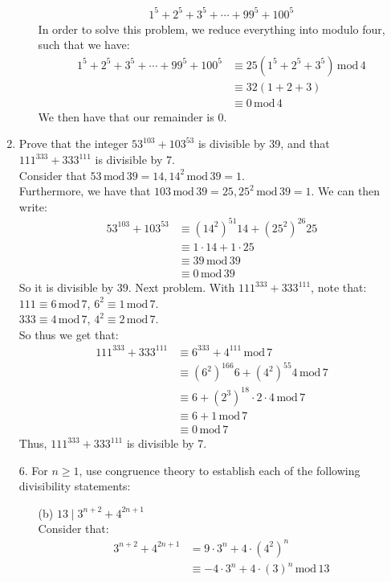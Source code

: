 \documentclass[10pt,oneside]{book}
\newcommand{\gspc}{\vspace{0.13cm}} %
\newcommand{\gline}{\gspc\\} %
\newcommand{\gmod}{\,\text{mod}\,}
\begin{document}
\begin{enumerate}
\begin{enumerate}
\begin{align*}
			1^5+2^5+3^5+\cdots+99^5+100^5
		\end{align*}
		In order to solve this problem, we reduce everything into modulo four, such that we have:
		\begin{align*}
			1^5+2^5+3^5+\cdots+99^5+100^5&\equiv
			25(1^5 + 2^5+3^5) \gmod 4\\
			&\equiv 32(1+2+3)\\
			&\equiv 0\gmod 4
		\end{align*}
		We then have that our remainder is 0. 
	\end{enumerate}
	\item Prove that the integer $53^{103}+103^{53}$ is divisible by 39, and that $111^{333} + 333^{111}$ is divisible by 7.\gline
	Consider that $53\gmod 39 = 14, 14^2\gmod 39 = 1$. \\
	Furthermore, we have that $103\gmod 39 = 25, 25^2 \gmod 39 = 1$.
	We can then write:
	\begin{align*}
		53^{103}+103^{53}&\equiv (14^2)^{51}14 + (25^{2})^{26}25\\
		&\equiv 1\cdot 14 + 1 \cdot 25\\
		&\equiv 39\gmod 39\\
		&\equiv 0 \gmod 39
	\end{align*}
	So it is divisible by 39. Next problem. With $111^{333} + 333^{111}$, note that:\gline
	$111\equiv 6\gmod 7$, $6^2 \equiv 1 \gmod 7$. \\
	$333\equiv 4\gmod 7$, $4^2 \equiv 2 \gmod 7$.\gline
	So thus we get that:
	\begin{align*}
		111^{333} + 333^{111}&\equiv 6^{333}+4^{111} \gmod 7\\
		&\equiv (6^2)^{166}6 + (4^2)^{55}4\gmod 7\\
		&\equiv 6 + (2^{3})^{18}\cdot 2\cdot 4\gmod 7\\
		&\equiv 6 + 1 \gmod 7\\
		&\equiv 0 \gmod 7
	\end{align*}
	Thus, $111^{333} + 333^{111}$ is divisible by 7.
	\item[6.] For $n\ge 1$, use congruence theory to establish each of the following divisibility statements:
	\begin{enumerate}
		\item [(b)] $13\mid 3^{n+2}+4^{2n+1}$\gline
		Consider that:
		\begin{align*}
			3^{n+2}+4^{2n+1}&= 9\cdot 3^n + 4\cdot (4^2)^n\\
			&\equiv -4 \cdot 3^n + 4 \cdot (3)^n \gmod 13\\

\end{align*}
\end{enumerate}
\end{enumerate}
\end{document}
